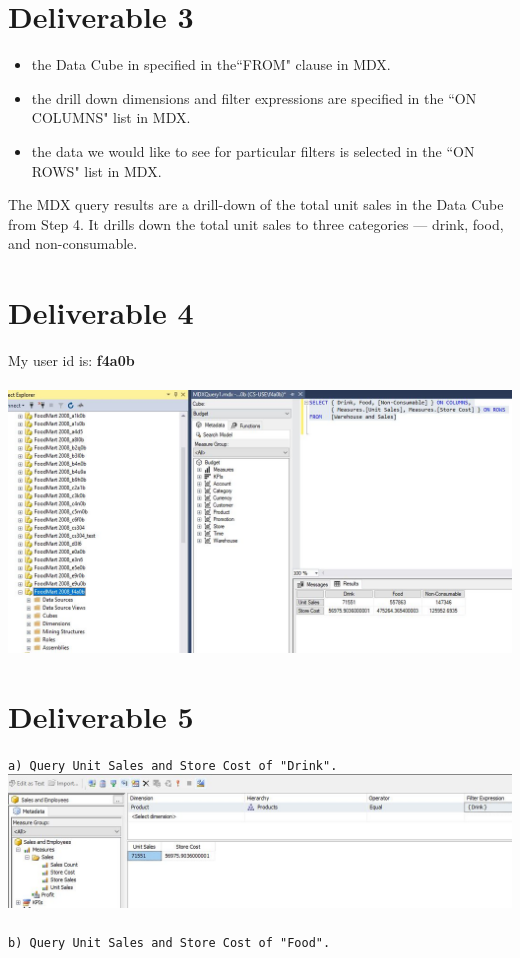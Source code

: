 \documentclass{article}
\begin{document}
\section{Deliverable 3}

\begin{itemize}
	\item the Data Cube in specified in the``FROM" clause in MDX.
	\item the drill down dimensions and filter expressions are specified in the ``ON COLUMNS" list in MDX.
	\item the data we would like to see for particular filters is selected in the ``ON ROWS" list in MDX.
\end{itemize}

The MDX query results are a drill-down of the total unit sales in the Data Cube from Step 4. It drills down the total unit sales to three categories --- drink, food, and non-consumable.

\section{Deliverable 4}

My user id is: \textbf{f4a0b} \\
\\
\noindent \includegraphics[scale=0.68]{deliverable4.jpg}

\section{Deliverable 5}

\texttt{a) Query Unit Sales and Store Cost of "Drink".}\\

\noindent \includegraphics[scale=0.72]{deliverable5_1.jpg}\\
\\
\noindent \texttt{b) Query Unit Sales and Store Cost of "Food".}\\
\end{document}
